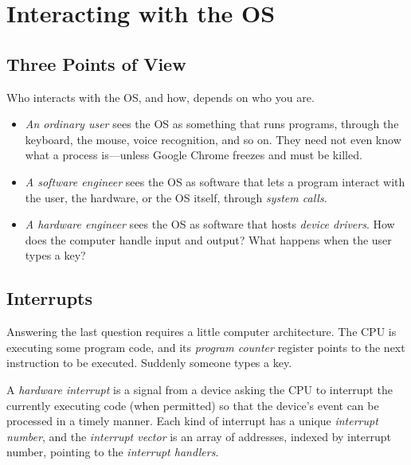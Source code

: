 \section{Interacting with the OS}
\label{sec:interact}

\subsection{Three Points of View}

Who interacts with the OS, and how, depends on who you are.
\begin{itemize}
  \item \emph{An ordinary user} sees the OS as something that runs programs, through the keyboard, the mouse, voice recognition, and so on. They need not even know what a process is---unless Google Chrome freezes and must be killed.
  \item \emph{A software engineer} sees the OS as software that lets a program interact with the user, the hardware, or the OS itself, through \emph{system calls}.
  \item \emph{A hardware engineer} sees the OS as software that hosts \emph{device drivers}. How does the computer handle input and output? What happens when the user types a key?
\end{itemize}

\subsection{Interrupts}

Answering the last question requires a little computer architecture. The CPU is executing some program code, and its \emph{program counter} register points to the next instruction to be executed. Suddenly someone types a key.

\begin{definition}[Interrupt]
  A \emph{hardware interrupt} is a signal from a device asking the CPU to interrupt the currently executing code (when permitted) so that the device's event can be processed in a timely manner. Each kind of interrupt has a unique \emph{interrupt number}, and the \emph{interrupt vector} is an array of addresses, indexed by interrupt number, pointing to the \emph{interrupt handlers}.
\end{definition}

